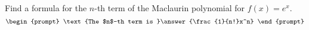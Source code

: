 \documentclass{ximera}
\author{Gregory Hartman \and Matthew Carr}
\begin{document}
\begin{exercise}





Find a formula for the $n$-th term of the Maclaurin polynomial for $f(x)=e^x$.
\[
\begin{prompt}
\text{The $n$-th term is }\answer{\frac{1}{n!}x^n}
\end{prompt}
\]

\end{exercise}
\end{document}
